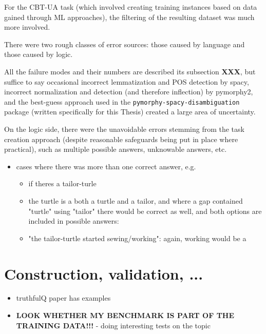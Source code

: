For the CBT-UA task (which involved creating training instances based on
data gained through ML approaches), the filtering of the resulting
dataset was much more involved.

There were two rough classes of error sources: those caused by language
and those caused by logic.

All the failure modes and their numbers are described its subsection
\textbf{XXX}, but suffice to say occasional incorrect lemmatization and
POS detection by spacy, incorrect normalization and detection (and
therefore inflection) by pymorphy2, and the best-guess approach used in
the \texttt{pymorphy-spacy-disambiguation} package (written specifically
for this Thesis) created a large area of uncertainty.

On the logic side, there were the unavoidable errors stemming from the
task creation approach (despite reasonable safeguards being put in place
where practical), such as multiple possible answers, unknowable answers,
etc.

\begin{itemize}
\tightlist
\item
  cases where there was more than one correct answer, e.g.

  \begin{itemize}
  \tightlist
  \item
    if there\textquotesingle s a tailor-turle
  \item
    the turtle is a both a turtle and a tailor, and where a gap
    contained "turtle" using "tailor" there would be correct as well,
    and both options are included in possible answers:
  \item
    "the tailor-turtle started sewing/working": again, working would be
    a
  \end{itemize}
\end{itemize}

\section{Construction, validation, ...}\label{construction-validation-}

\begin{itemize}
\tightlist
\item
  truthfulQ\cite{linTruthfulQAMeasuringHow2022} paper has examples
\item
  \textbf{LOOK WHETHER MY BENCHMARK IS PART OF THE TRAINING DATA!!!} -
  doing interesting tests on the topic
\end{itemize}

